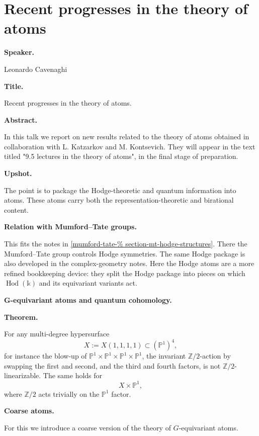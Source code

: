 \section{Recent progresses in the
theory of atoms}
\label{section-recent-progresses-in-
the-theory-of-atoms}

\medskip\noindent
{\bf Speaker.}

Leonardo Cavenaghi

\medskip\noindent
{\bf Title.}

Recent progresses in the theory of
atoms.

\medskip\noindent
{\bf Abstract.}

In this talk we report on new
results related to the theory of
atoms obtained in collaboration
with L. Katzarkov and M.
Kontsevich. They will appear in the
text titled "9.5 lectures in the
theory of atoms", in the final
stage of preparation.

\medskip\noindent
{\bf Upshot.}

The point is to package the
Hodge-theoretic and quantum
information into atoms.
These atoms carry both the
representation-theoretic and
birational content.

\medskip\noindent
{\bf Relation with
Mumford--Tate groups.}

This fits the notes in
\ref{mumford-tate-%
section-mt-hodge-structures}.
There the Mumford--Tate group
controls Hodge symmetries.
The same Hodge package is also
developed in the complex-geometry
notes.
Here the Hodge atoms are a more
refined bookkeeping device:
they split the Hodge package into
pieces on which
$
\operatorname{Hod}(\mathbb{k})
$
and its equivariant variants act.

\medskip\noindent
{\bf G-equivariant atoms and
quantum cohomology.}

\medskip\noindent
{\bf Theorem.}

For any multi-degree hypersurface
$$
X:=X(1,1,1,1)\subset(\mathbb{P}^1)^4,
$$
for instance the blow-up of
$\mathbb{P}^1\times\mathbb{P}^1
\times\mathbb{P}^1\times\mathbb{P}^1$,
the invariant $\mathbb{Z}/2$-action
by swapping the first and second,
and the third and fourth factors,
is not $\mathbb{Z}/2$-linearizable.
The same holds for
$$
X\times\mathbb{P}^1,
$$
where $\mathbb{Z}/2$ acts trivially
on the $\mathbb{P}^1$ factor.

\medskip\noindent
{\bf Coarse atoms.}

For this we introduce a coarse
version of the theory of
$G$-equivariant atoms.

